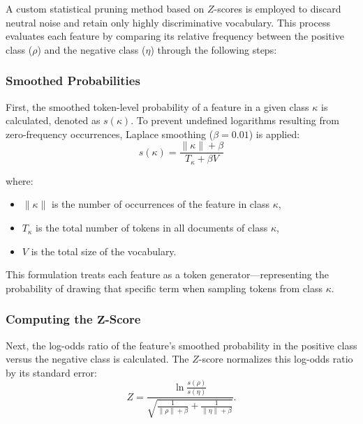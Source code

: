 \documentclass[a4paper,twoside,12pt]{book}
\newcommand{\zscore}{Z}
\newcommand{\positive}{\rho}
\newcommand{\negative}{\eta}
\newcommand{\smoothedprob}[1]{s(#1)}
\newcommand{\Count}[1]{\|{#1}\|}
\newcommand{\vocabsize}{V}
\newcommand{\tokenclass}{\kappa}
\newcommand{\numbertokens}[1]{T_{#1}}
\newcommand{\smoothparam}{\beta}
\begin{document}
A custom statistical pruning method based on $\zscore$-scores is employed to discard neutral noise and retain only highly discriminative vocabulary. This process evaluates each feature by comparing its relative frequency between the positive class ($\positive$) and the negative class ($\negative$) through the following steps:

\subsubsection{Smoothed Probabilities}

First, the smoothed token-level probability of a feature in a given class $\tokenclass$ is calculated, denoted as $\smoothedprob{\tokenclass}$. To prevent undefined logarithms resulting from zero-frequency occurrences, Laplace smoothing ($\smoothparam = 0.01$) is applied:
\begin{equation}
	\smoothedprob{\tokenclass} = \frac{\Count{\tokenclass} + \smoothparam}{\numbertokens{\tokenclass} + \smoothparam \vocabsize}
\end{equation}

where:
\begin{itemize}
	\item $\Count{\tokenclass}$ is the number of occurrences of the feature in class $\tokenclass$,
	\item $\numbertokens{\tokenclass}$ is the total number of tokens in all documents of class $\tokenclass$,
	\item $\vocabsize$ is the total size of the vocabulary.
\end{itemize}
This formulation treats each feature as a token generator---representing the probability of drawing that specific term when sampling tokens from class $\tokenclass$.

\subsubsection{Computing the $\mathbf{\zscore}$-Score}
Next, the log-odds ratio of the feature's smoothed probability in the positive class versus the negative class is calculated. The $\zscore$-score normalizes this log-odds ratio by its standard error:
\begin{equation}
	\zscore = \frac{\ln\frac{\smoothedprob{\positive}}{\smoothedprob{\negative}}}{\sqrt{\frac{1}{\Count{\positive} + \smoothparam} + \frac{1}{\Count{\negative} + \smoothparam}}}.
\end{equation}
\end{document}
